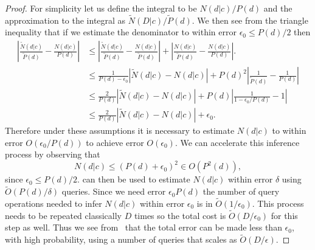 \documentclass[aps,amsmath,onecolumn,amssymb]{revtex4}
\begin{document}
\begin{proof}
For simplicity let us define the integral to be $N(d|c)/P(d)$ and the approximation to the integral as $\tilde{N}(D|c)/\tilde{P}(d)$.  We then see from the triangle inequality that if we estimate the denominator to within error $\epsilon_0\le P(d)/2$ then
\begin{align}
\left|\frac{\tilde{N}(d|c)}{\tilde{P}(d)} -\frac{{N}(d|c)}{{P}(d)}\right|&\le \left|\frac{\tilde{N}(d|c)}{\tilde{P}(d)} -\frac{{N}(d|c)}{\tilde {P}(d)}\right|+\left|\frac{{N}(d|c)}{\tilde{P}(d)} -\frac{{N}(d|c)}{{P}(d)}\right|.\nonumber\\
&\le \frac{1}{P(d)-\epsilon_0}\left|{\tilde{N}(d|c)} -{{N}(d|c)}{}\right|+P(d)^2\left|\frac{1}{\tilde{P}(d)} -\frac{1}{{P}(d)}\right|\nonumber\\
&\le \frac{2}{P(d)}\left|{\tilde{N}(d|c)} -{{N}(d|c)}{}\right|+P(d)\left|\frac{1}{1-\epsilon_0/P(d)} -1\right|\nonumber\\
&\le \frac{2}{P(d)}\left|{\tilde{N}(d|c)} -{{N}(d|c)}{}\right|+\epsilon_0.\label{eq:2IntegralTerms}
\end{align}
Therefore under these assumptions it is necessary to estimate $N(d|c)$ to within error $O(\epsilon_0/P(d))$ to achieve error $O(\epsilon_0)$.
We can accelerate this inference process by observing that 
\begin{equation}
N(d|c)\le (P(d)+\epsilon_0)^2\in O(P^2(d)),
\end{equation}
since $\epsilon_0 \le P(d)/2$.   can then be used to estimate $N(d|c)$ within error $\delta$ using $\tilde O(P(d)/\delta)$ queries.  Since we need error $\epsilon_0P(d)$ the number of query operations needed to infer $N(d|c)$ within error $\epsilon_0$ is in $\tilde O(1/\epsilon_0)$.  This process needs to be repeated classically $D$ times so the total cost is $\tilde O(D/\epsilon_0)$ for this step as well.  Thus we see from~ that the total error can be made less than $\epsilon_0$, with high probability, using a number of queries that scales as $\tilde{O}(D/\epsilon)$.





\end{proof}
\end{document}
